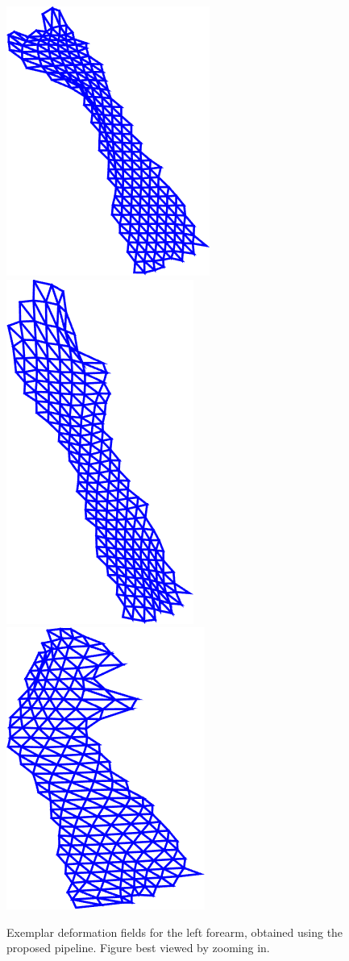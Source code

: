 \begin{figure}[t!]
    \includegraphics[height=\flowh]{resources/Fig_Flows/4}
    \includegraphics[height=\flowh]{resources/Fig_Flows/5}
    \includegraphics[height=\flowh]{resources/Fig_Flows/6}
    \caption{Exemplar deformation fields for the left forearm, obtained using the proposed pipeline. Figure best viewed by zooming in.}
    \label{fig:deformationfield}
\end{figure}





